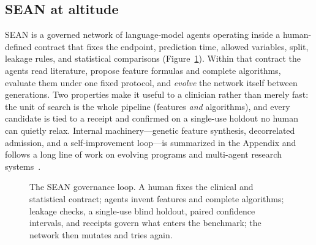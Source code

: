 \documentclass[11pt]{article}
\newcommand{\sean}{SEAN}
\begin{document}
\subsection{\sean{} at altitude}
\sean{} is a governed network of language-model agents operating inside a human-defined
contract that fixes the endpoint, prediction time, allowed variables, split, leakage rules,
and statistical comparisons (Figure~\ref{fig:loop}). Within that contract the agents read
literature, propose feature formulas and complete algorithms, evaluate them under one fixed
protocol, and \emph{evolve} the network itself between generations. Two properties make it
useful to a clinician rather than merely fast: the unit of search is the whole pipeline
(features \emph{and} algorithms), and every candidate is tied to a receipt and confirmed on a
single-use holdout no human can quietly relax. Internal machinery---genetic feature synthesis,
decorrelated admission, and a self-improvement loop---is summarized in the Appendix and
follows a long line of work on evolving programs and multi-agent research
systems~\cite{koza1992,real2020,autogen2023,evoagent2024}.

\begin{figure}[t]
\centering
{}
\caption{The \sean{} governance loop. A human fixes the clinical and statistical contract;
agents invent features and complete algorithms; leakage checks, a single-use blind holdout,
paired confidence intervals, and receipts govern what enters the benchmark; the network then
mutates and tries again.}
\label{fig:loop}
\end{figure}
\end{document}

